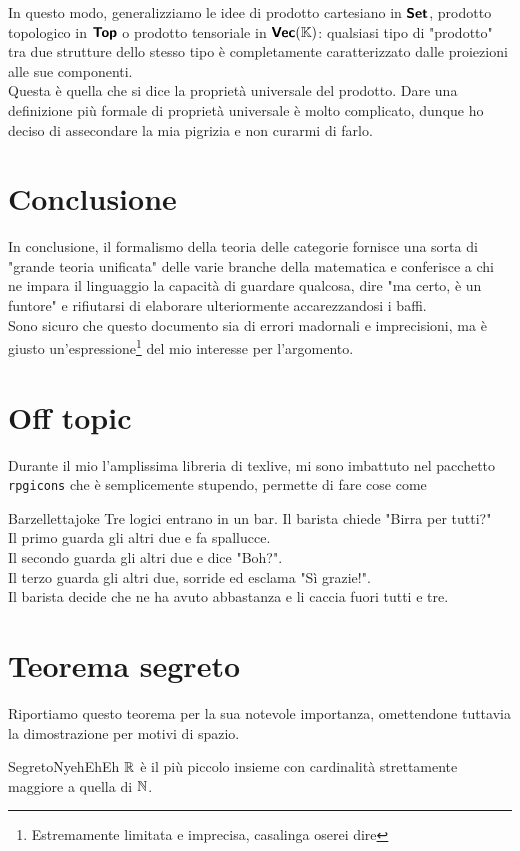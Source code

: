 \documentclass{article}
\begin{document}
In questo modo, generalizziamo le idee di prodotto cartesiano in $\text{\sffamily\textbf{Set}}$, prodotto topologico in $\text{\sffamily\textbf{Top}}$ o prodotto tensoriale in $\text{\sffamily\textbf{Vec}}(\mathbb{K})$: qualsiasi tipo di "prodotto" tra due strutture dello stesso tipo è completamente caratterizzato dalle proiezioni alle sue componenti.\\
Questa è quella che si dice la proprietà universale del prodotto. Dare una definizione più formale di proprietà universale è molto complicato, dunque ho deciso di assecondare la mia pigrizia e non curarmi di farlo.

\section{Conclusione}
\label{sec:Ending}

In conclusione, il formalismo della teoria delle categorie fornisce una sorta di "grande teoria unificata" delle varie branche della matematica e conferisce a chi ne impara il linguaggio la capacità di guardare qualcosa, dire "ma certo, è un funtore" e rifiutarsi di elaborare ulteriormente accarezzandosi i baffi.\\
Sono sicuro che questo documento sia  di errori madornali e imprecisioni, ma è giusto un'espressione\footnote{Estremamente limitata e imprecisa, casalinga oserei dire} del mio interesse per l'argomento.

\section{Off topic}
\label{sec:OffTopic}

Durante il mio  l'amplissima libreria di texlive, mi sono imbattuto nel pacchetto \texttt{rpgicons} che è semplicemente stupendo, permette di fare cose come 

\begin{proposition}{Barzelletta}{joke}
    Tre logici entrano in un bar. Il barista chiede "Birra per tutti?"\\
    Il primo guarda gli altri due e fa spallucce.\\
    Il secondo guarda gli altri due e dice "Boh?".\\
    Il terzo guarda gli altri due, sorride ed esclama "Sì grazie!".\\
    Il barista decide che ne ha avuto abbastanza e li caccia fuori tutti e tre.\\
\end{proposition}

\section{Teorema segreto}
Riportiamo questo teorema per la sua notevole importanza, omettendone tuttavia la dimostrazione per motivi di spazio.\cite{Menegolli2024}
\begin{theorem}{Segreto}{NyehEhEh}
    $\mathbb{R}$ è il più piccolo insieme con cardinalità strettamente maggiore a quella di $\mathbb{N}$.
\end{theorem}

\printbibliography
\end{document}
